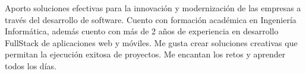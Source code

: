 

\begin{cvparagraph}

Aporto soluciones efectivas para la innovación y modernización de las empresas a través del desarrollo de software. Cuento con formación académica en Ingeniería Informática, además cuento con más de 2 años de experiencia en desarrollo FullStack de aplicaciones web y móviles. Me gusta crear soluciones creativas que permitan la ejecución exitosa de proyectos.
Me encantan los retos y aprender todos los días.

\end{cvparagraph}
